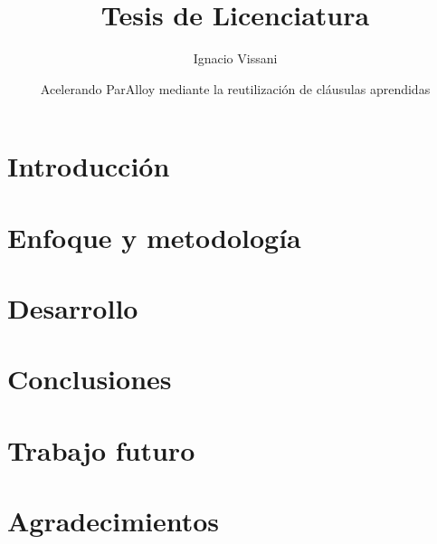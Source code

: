 \documentclass[a4paper, 11pt]{book}
\begin{document}
\author{Ignacio Vissani}
\title{Tesis de Licenciatura}
\date{Acelerando ParAlloy mediante la reutilización de cláusulas aprendidas}

\maketitle
\tableofcontents

\chapter{Introducción}
\chapter{Enfoque y metodología}
\chapter{Desarrollo}
\chapter{Conclusiones}
\chapter{Trabajo futuro}
\chapter{Agradecimientos}
\end{document}
